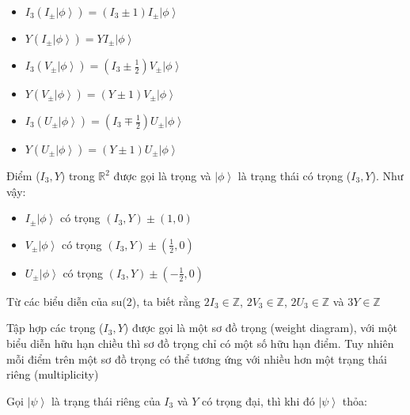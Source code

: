 \documentclass{report}
\begin{document}
	\begin{itemize}
		\item \( I_{3} \left( I_{\pm} \left| \phi \right\rangle \right) = \left( I_{3} \pm 1 \right) I_{\pm} \left| \phi \right\rangle \)
		\item \( Y \left( I_{\pm} \left| \phi \right\rangle \right) = Y I_{\pm} \left| \phi \right\rangle \)
		\item \( I_{3} \left( V_{\pm} \left| \phi \right\rangle \right) = \left( I_{3} \pm \frac{1}{2} \right) V_{\pm} \left| \phi \right\rangle \)
		\item \( Y \left( V_{\pm} \left| \phi \right\rangle \right) = \left( Y \pm 1 \right) V_{\pm} \left| \phi \right\rangle \)
		\item \( I_{3} \left( U_{\pm} \left| \phi \right\rangle \right) = \left( I_{3} \mp \frac{1}{2} \right) U_{\pm} \left| \phi \right\rangle \)
		\item \( Y \left( U_{\pm} \left| \phi \right\rangle \right) = \left( Y \pm 1 \right) U_{\pm} \left| \phi \right\rangle \)
	\end{itemize}
	
Điểm (\( I_{3}, Y \)) trong \( \mathbb{R}^{2} \) được gọi là trọng và \( \left| \phi \right\rangle \) là trạng thái có trọng (\( I_{3}, Y \)). Như vậy:
	
	\begin{itemize}
		\item \( I_{\pm} \left| \phi \right\rangle \) có trọng \( \left( I_{3}, Y \right) \pm \left( 1, 0 \right) \)
		\item \( V_{\pm} \left| \phi \right\rangle \) có trọng \( \left( I_{3}, Y \right) \pm \left( \frac{1}{2}, 0 \right) \)
		\item \( U_{\pm} \left| \phi \right\rangle \) có trọng \( \left( I_{3}, Y \right) \pm \left( - \frac{1}{2}, 0 \right) \)
	\end{itemize}

Từ các biểu diễn của su(2), ta biết rằng \( 2I_{3} \in \mathbb{Z} \), \( 2V_{3} \in \mathbb{Z} \), \( 2U_{3} \in \mathbb{Z} \) và \( 3Y \in \mathbb{Z} \)

Tập hợp các trọng (\( I_{3}, Y \)) được gọi là một sơ đồ trọng (weight diagram), với một biểu diễn hữu hạn chiều thì sơ đồ trọng chỉ có một số hữu hạn điểm. Tuy nhiên mỗi điểm trên một sơ đồ trọng có thể tương ứng với nhiều hơn một trạng thái riêng (multiplicity)

Gọi \( \left| \psi \right\rangle \) là trạng thái riêng của \( I_{3} \) và \( Y \) có trọng đại, thì khi đó \( \left| \psi \right\rangle \) thỏa:
\end{document}
